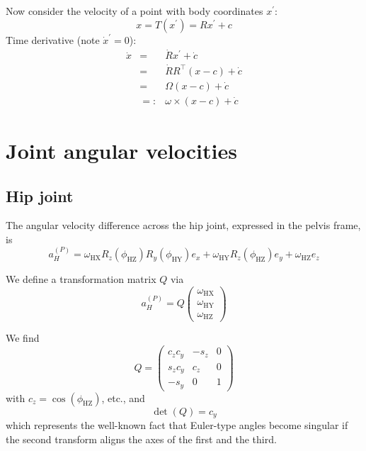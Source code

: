 \documentclass[a4paper]{article}
\begin{document}
Now consider the velocity of a point with body coordinates $x^\prime$:
\begin{equation}
x = T(x^\prime) = R x^\prime + c
\end{equation}
Time derivative (note $\dot{x}^\prime = 0$):
\begin{eqnarray}
\dot{x} &=& \dot{R} x^\prime + \dot{c}\\
&=& \dot{R}R^\top(x - c) + \dot{c}\\
&=& \Omega (x - c) + \dot{c}\\
&=:& \omega \times (x - c) + \dot{c}
\end{eqnarray}

\section{Joint angular velocities}
\subsection{Hip joint}
The angular velocity difference across the hip joint, expressed in the pelvis frame, is
\begin{equation}
a_H^{(P)} = \omega_\mathrm{HX} R_z(\phi_\mathrm{HZ}) R_y(\phi_\mathrm{HY}) e_x
+ \omega_\mathrm{HY} R_z(\phi_\mathrm{HZ}) e_y
+ \omega_\mathrm{HZ} e_z
\end{equation}

We define a transformation matrix $Q$ via
\begin{equation}
a_H^{(P)} = Q \left(\begin{array}{c}
\omega_\mathrm{HX} \\ \omega_\mathrm{HY} \\ \omega_\mathrm{HZ}
\end{array}\right)
\end{equation}

We find
\begin{equation}
Q = \left(\begin{array}{ccc}
c_z c_y & -s_z & 0\\
s_z c_y & c_z  & 0\\
-s_y    & 0    & 1
\end{array}\right)
\end{equation}
with $c_z = \cos(\phi_\mathrm{HZ})$, etc., and
\begin{equation}
\det(Q) = c_y
\end{equation}
which represents the well-known fact that Euler-type angles become singular if the second transform aligns the axes of the first and the third.
\end{document}

